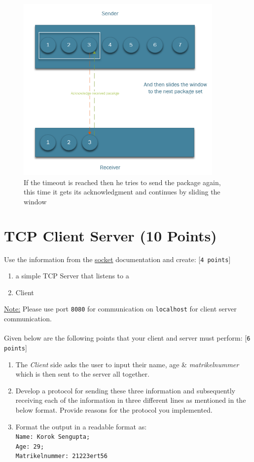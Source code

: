 \documentclass{WeSTassignment}
\begin{document}
\begin{figure}[h]
  	\centering
  	\includegraphics[width=0.9\textwidth]{swp3.png}
   	\caption{If the timeout is reached then he tries to send the package again, this time it gets its acknowledgment and continues by sliding the window}
     \label{fig:server}
\end{figure}




\section{TCP Client Server (10 Points)}

Use the information from the \href{https://docs.python.org/3/howto/sockets.html}{socket} documentation and create: [\texttt{4 points}]
\begin{enumerate}
\item a simple TCP Server that listens to a
\item Client
\end{enumerate}
\underline{Note:} Please use port \texttt{8080} for communication on \texttt{localhost} for client server communication.\\ \\
Given below are the following points that your client and server must perform: [\texttt{6 points}]
\begin{enumerate}
\item The \emph{Client} side asks the user to input their name, age \& \emph{matrikelnummer} which is then sent to the server all together.
\item Develop a protocol for sending these three information and subsequently receiving each of the information in three different lines as mentioned in the below format. Provide reasons for the protocol you implemented. 
\item Format the output in a readable format as:\texttt{\\ Name: Korok Sengupta; \\ Age: 29; \\ Matrikelnummer: 21223ert56}
\end{enumerate}
\end{document}
